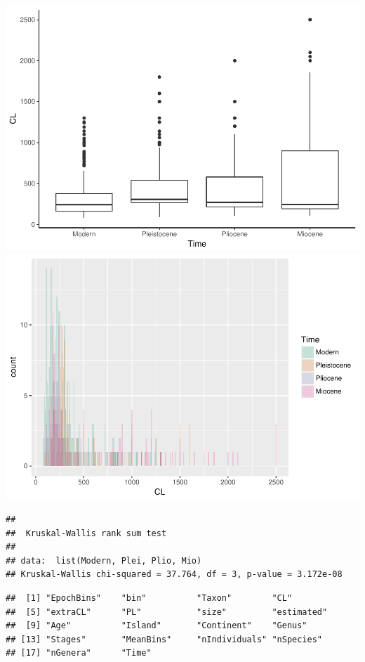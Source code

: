 \documentclass[]{article}
\begin{document}
\includegraphics{MA_JJ_files/figure-latex/Boxplot Modern, Pleistocene etc.-1.pdf}
\includegraphics{MA_JJ_files/figure-latex/Boxplot Modern, Pleistocene etc.-2.pdf}

\begin{verbatim}
## 
##  Kruskal-Wallis rank sum test
## 
## data:  list(Modern, Plei, Plio, Mio)
## Kruskal-Wallis chi-squared = 37.764, df = 3, p-value = 3.172e-08
\end{verbatim}

\begin{verbatim}
##  [1] "EpochBins"    "bin"          "Taxon"        "CL"          
##  [5] "extraCL"      "PL"           "size"         "estimated"   
##  [9] "Age"          "Island"       "Continent"    "Genus"       
## [13] "Stages"       "MeanBins"     "nIndividuals" "nSpecies"    
## [17] "nGenera"      "Time"
\end{verbatim}
\end{document}
